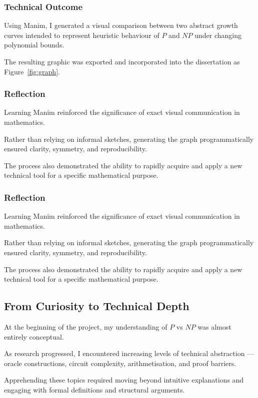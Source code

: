 \documentclass[12pt]{article}
\begin{document}
\subsubsection*{Technical Outcome}

Using Manim, I generated a visual comparison between two abstract growth curves intended to represent heuristic behaviour of $P$ and $NP$ under changing polynomial bounds.

The resulting graphic was exported and incorporated into the dissertation as Figure~\ref{fig:graph}.

\subsubsection*{Reflection}

Learning Manim reinforced the significance of exact visual communication in mathematics.

Rather than relying on informal sketches, generating the graph programmatically ensured clarity, symmetry, and reproducibility.

The process also demonstrated the ability to rapidly acquire and apply a new technical tool for a specific mathematical purpose.

\subsubsection*{Reflection}

Learning Manim reinforced the significance of exact visual communication in mathematics.

Rather than relying on informal sketches, generating the graph programmatically ensured clarity, symmetry, and reproducibility.

The process also demonstrated the ability to rapidly acquire and apply a new technical tool for a specific mathematical purpose.

\subsection*{From Curiosity to Technical Depth}

At the beginning of the project, my understanding of $P$ vs $NP$ was almost entirely conceptual.

As research progressed, I encountered increasing levels of technical abstraction --- oracle constructions, circuit complexity, arithmetisation, and proof barriers.

Apprehending these topics required moving beyond intuitive explanations and engaging with formal definitions and structural arguments.
\end{document}
